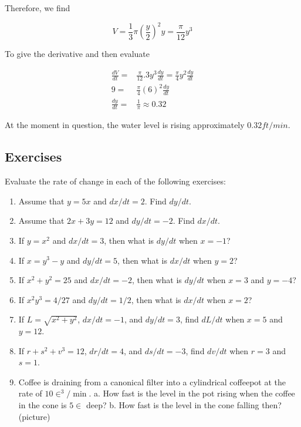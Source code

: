 \documentclass[fleqn]{article}
\begin{document}
\noindent
Therefore, we find

\begin{equation*}
    V = \frac{1}{3} \pi \left(\frac{y}{2}\right)^2 y = \frac{\pi}{12} y^3
\end{equation*}

\noindent
To give the derivative and then evaluate

\begin{align*}
    \frac{dV}{dt} =& \frac{\pi}{12}.3y^3 \frac{dy}{dt} = \frac{\pi}{4}y^2\frac{dy}{dt} \\
    9 =& \frac{\pi}{4}\left(6\right)^2\frac{dy}{dt} \\
    \frac{dy}{dt} =& \frac{1}{\pi} \approx 0.32
\end{align*}

\noindent
At the moment in question, the water level is rising approximately $0.32 ft/min$.

\subsection*{Exercises}
\noindent
Evaluate the rate of change in each of the following exercises:
\newline

\begin{enumerate}
\item Assume that $y = 5x$ and $dx/dt = 2$. Find $dy/dt$.
\item Assume that $2x + 3y = 12$ and $dy/dt = -2$. Find $dx/dt$.
\item If $y=x^2$ and $dx/dt=3$, then what is $dy/dt$ when $x=-1$?
\item If $x=y^3-y$ and $dy/dt=5$, then what is $dx/dt$ when $y=2$?
\item If $x^2+y^2=25$ and $dx/dt=-2$, then what is $dy/dt$ when $x=3$ and $y=-4$?
\item If $x^2y^3=4/27$ and $dy/dt=1/2$, then what is $dx/dt$ when $x=2$?
\item If $L=\sqrt{x^2+y^2}$, $dx/dt=-1$, and $dy/dt=3$, find $dL/dt$ when $x=5$ and $y=12$.
\item If $r+s^2+v^3=12$, $dr/dt=4$, and $ds/dt=-3$, find $dv/dt$ when $r=3$ and $s=1$.
\item Coffee is draining from a canonical filter into a cylindrical coffeepot at the rate of $10\in^3/\min$.
a. How fast is the level in the pot rising when the coffee in the cone is $5\in$ deep?
b. How fast is the level in the cone falling then?
(picture)
\end{enumerate}
\end{document}
